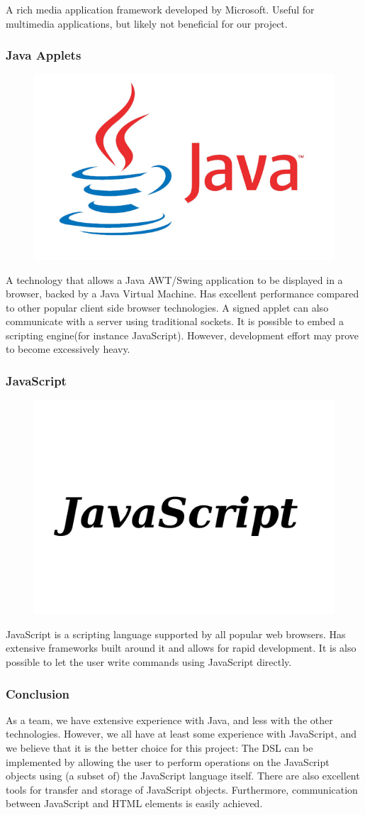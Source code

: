 A rich media application framework developed by Microsoft. Useful for multimedia applications, but likely not beneficial for our project.

\subsubsection{Java Applets}

\begin{figure}
\vspace{-30pt}
\centering
\includegraphics[width=.14\textwidth]{image/java-logo.jpg}
\end{figure}

A technology that allows a Java AWT/Swing application to be displayed in a browser, backed by a Java Virtual Machine. Has excellent performance compared to other popular client side browser technologies. A signed applet can also communicate with a server using traditional sockets. It is possible to embed a scripting engine(for instance JavaScript). However, development effort may prove to become excessively heavy.

\subsubsection{JavaScript}

\begin{figure}
\vspace{-20pt}
\centering
\includegraphics[width=.14\textwidth]{image/javascript-logo.png}
\end{figure}


JavaScript is a scripting language supported by all popular web browsers. Has extensive frameworks built around it and allows for rapid development. It is also possible to let the user write commands using JavaScript directly.

\subsubsection{Conclusion}
As a team, we have extensive experience with Java, and less with the other technologies. However, we all have at least some experience with JavaScript, and we believe that it is the better choice for this project: The DSL can be implemented by allowing the user to perform operations on the JavaScript objects using (a subset of) the JavaScript language itself. There are also excellent tools for transfer and storage of JavaScript objects. Furthermore, communication between JavaScript and HTML elements is easily achieved.

